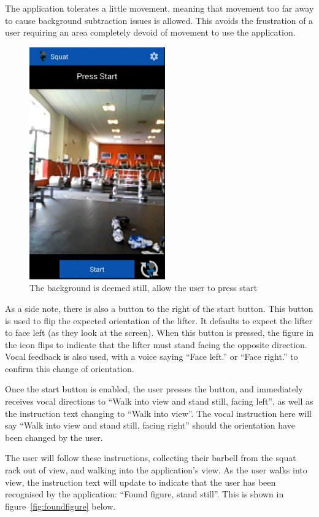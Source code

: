 The application tolerates a little movement, meaning that movement too far away to cause background subtraction issues is allowed. This avoids the frustration of a user requiring an area completely devoid of movement to use the application.

\begin{figure}[H]
    \centering
	\includegraphics[height=10cm]{application/images/pressstart}
\caption{The background is deemed still, allow the user to press start}
\label{fig:pressstart}
\end{figure}

As a side note, there is also a button to the right of the start button. This button is used to flip the expected orientation of the lifter. It defaults to expect the lifter to face left (as they look at the screen). When this button is pressed, the figure in the icon flips to indicate that the lifter must stand facing the opposite direction. Vocal feedback is also used, with a voice saying ``Face left.'' or ``Face right.'' to confirm this change of orientation.

Once the start button is enabled, the user presses the button, and immediately receives vocal directions to ``Walk into view and stand still, facing left'', as well as the instruction text changing to ``Walk into view''. The vocal instruction here will say ``Walk into view and stand still, facing right'' should the orientation have been changed by the user.

The user will follow these instructions, collecting their barbell from the squat rack out of view, and walking into the application's view. As the user walks into view, the instruction text will update to indicate that the user has been recognised by the application: ``Found figure, stand still''. This is shown in figure~\ref{fig:foundfigure} below.

